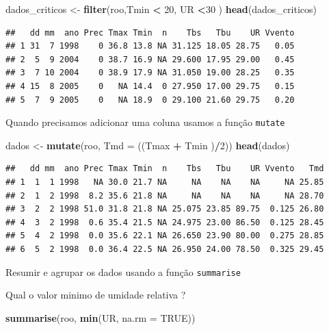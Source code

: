 \documentclass[
]{book}
\newenvironment{Shaded}{\begin{snugshade}}{\end{snugshade}}
\newcommand{\DataTypeTok}[1]{\textcolor[rgb]{0.13,0.29,0.53}{#1}}
\newcommand{\DecValTok}[1]{\textcolor[rgb]{0.00,0.00,0.81}{#1}}
\newcommand{\KeywordTok}[1]{\textcolor[rgb]{0.13,0.29,0.53}{\textbf{#1}}}
\newcommand{\NormalTok}[1]{#1}
\newcommand{\OperatorTok}[1]{\textcolor[rgb]{0.81,0.36,0.00}{\textbf{#1}}}
\newcommand{\OtherTok}[1]{\textcolor[rgb]{0.56,0.35,0.01}{#1}}
\newcommand{\StringTok}[1]{\textcolor[rgb]{0.31,0.60,0.02}{#1}}
\begin{document}
\begin{Shaded}
\begin{Highlighting}[]
\NormalTok{dados_criticos <-}\StringTok{ }\KeywordTok{filter}\NormalTok{(roo,Tmin }\OperatorTok{<}\StringTok{ }\DecValTok{20}\NormalTok{, UR }\OperatorTok{<}\DecValTok{30}\NormalTok{ )}
\KeywordTok{head}\NormalTok{(dados_criticos)}
\end{Highlighting}
\end{Shaded}

\begin{verbatim}
##   dd mm  ano Prec Tmax Tmin  n    Tbs   Tbu    UR Vvento
## 1 31  7 1998    0 36.8 13.8 NA 31.125 18.05 28.75   0.05
## 2  5  9 2004    0 38.7 16.9 NA 29.600 17.95 29.00   0.45
## 3  7 10 2004    0 38.9 17.9 NA 31.050 19.00 28.25   0.35
## 4 15  8 2005    0   NA 14.4  0 27.950 17.00 29.75   0.15
## 5  7  9 2005    0   NA 18.9  0 29.100 21.60 29.75   0.20
\end{verbatim}

Quando precisamos adicionar uma coluna usamos a função \texttt{mutate}

\begin{Shaded}
\begin{Highlighting}[]
\NormalTok{dados <-}\StringTok{ }\KeywordTok{mutate}\NormalTok{(roo, }\DataTypeTok{Tmd =}\NormalTok{ ((Tmax }\OperatorTok{+}\StringTok{ }\NormalTok{Tmin )}\OperatorTok{/}\DecValTok{2}\NormalTok{))}
\KeywordTok{head}\NormalTok{(dados)}
\end{Highlighting}
\end{Shaded}

\begin{verbatim}
##   dd mm  ano Prec Tmax Tmin  n    Tbs   Tbu    UR Vvento   Tmd
## 1  1  1 1998   NA 30.0 21.7 NA     NA    NA    NA     NA 25.85
## 2  1  2 1998  8.2 35.6 21.8 NA     NA    NA    NA     NA 28.70
## 3  2  2 1998 51.0 31.8 21.8 NA 25.075 23.85 89.75  0.125 26.80
## 4  3  2 1998  0.6 35.4 21.5 NA 24.975 23.00 86.50  0.125 28.45
## 5  4  2 1998  0.0 35.6 22.1 NA 26.650 23.90 80.00  0.275 28.85
## 6  5  2 1998  0.0 36.4 22.5 NA 26.950 24.00 78.50  0.325 29.45
\end{verbatim}

Resumir e agrupar os dados usando a função \texttt{summarise}

Qual o valor minimo de umidade relativa ?

\begin{Shaded}
\begin{Highlighting}[]
\KeywordTok{summarise}\NormalTok{(roo, }\KeywordTok{min}\NormalTok{(UR, }\DataTypeTok{na.rm =} \OtherTok{TRUE}\NormalTok{)) }
\end{Highlighting}
\end{Shaded}
\end{document}
